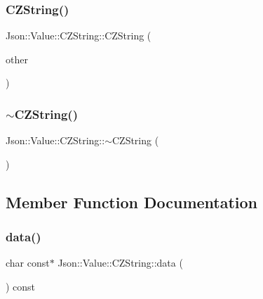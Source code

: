 \subsubsection{\texorpdfstring{C\+Z\+String()}{CZString()}\hspace{0.1cm}{\footnotesize\ttfamily [6/6]}}
{\footnotesize\ttfamily Json\+::\+Value\+::\+C\+Z\+String\+::\+C\+Z\+String (\begin{DoxyParamCaption}\item[{\hyperlink{class_json_1_1_value_1_1_c_z_string}{C\+Z\+String} const \&}]{other }\end{DoxyParamCaption})}

\hypertarget{class_json_1_1_value_1_1_c_z_string_add6989dc7073646b95e5ebacb3f07d51}{}\label{class_json_1_1_value_1_1_c_z_string_add6989dc7073646b95e5ebacb3f07d51} 
\subsubsection{\texorpdfstring{$\sim$\+C\+Z\+String()}{~CZString()}\hspace{0.1cm}{\footnotesize\ttfamily [2/2]}}
{\footnotesize\ttfamily Json\+::\+Value\+::\+C\+Z\+String\+::$\sim$\+C\+Z\+String (\begin{DoxyParamCaption}{ }\end{DoxyParamCaption})}



\subsection{Member Function Documentation}
\hypertarget{class_json_1_1_value_1_1_c_z_string_a606392bc1abed23d1387bf972bfd24ca}{}\label{class_json_1_1_value_1_1_c_z_string_a606392bc1abed23d1387bf972bfd24ca} 
\subsubsection{\texorpdfstring{data()}{data()}\hspace{0.1cm}{\footnotesize\ttfamily [1/2]}}
{\footnotesize\ttfamily char const$\ast$ Json\+::\+Value\+::\+C\+Z\+String\+::data (\begin{DoxyParamCaption}{ }\end{DoxyParamCaption}) const}

